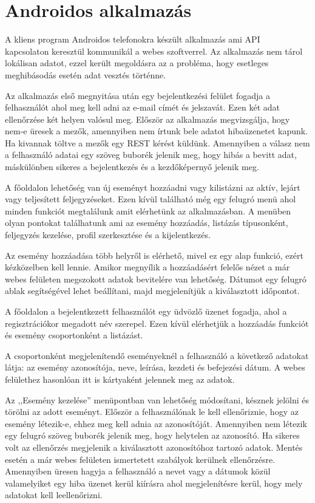 \documentclass[
]{thesis-ekf}
\theoremstyle{definition}
\theoremstyle{remark}
\begin{document}
\section{Androidos alkalmazás}
A kliens program Androidos telefonokra készült alkalmazás ami API~\cite{api_basic} kapcsolaton keresztül kommunikál a webes szoftverrel. Az alkalmazás nem tárol lokálisan adatot, ezzel került megoldásra az a probléma, hogy esetleges meghibásodás esetén adat vesztés történne. 

Az alkalmazás első megnyitása után egy bejelentkezési felület fogadja a felhasználót ahol meg kell adni az e-mail címét és jelszavát. Ezen két adat ellenőrzése két helyen valósul meg. Először az alkalmazás megvizsgálja, hogy nem-e üresek a mezők, amennyiben nem írtunk bele adatot hibaüzenetet kapunk. Ha kivannak töltve a mezők egy REST kérést küldünk. Amennyiben a válasz nem a felhasználó adatai egy szöveg buborék jelenik meg, hogy hibás a bevitt adat, máskülönben sikeres a bejelentkezés és a kezdőképernyő jelenik meg.

A főoldalon lehetőség van új eseményt hozzáadni vagy kilistázni az aktív, lejárt vagy teljesített feljegyzéseket. Ezen kívül található még egy felugró menü ahol minden funkciót megtalálunk amit elérhetünk az alkalmazásban. A menüben olyan pontokat találhatunk ami az esemény hozzáadás, listázás típusonként, feljegyzés kezelése, profil szerkesztése és a kijelentkezés. 

Az esemény hozzáadása több helyről is elérhető, mivel ez egy alap funkció, ezért kézközelben kell lennie. Amikor megnyílik a hozzáadásért felelős nézet a már webes felületen megszokott adatok bevitelére van lehetőség. Dátumot egy felugró ablak segítségével lehet beállítani, majd megjelenítjük a kiválasztott időpontot. 

A főoldalon a bejelentkezett felhasználót egy üdvözlő üzenet fogadja, ahol a regisztrációkor megadott név szerepel. Ezen kívül elérhetjük a hozzáadás funkciót és esemény csoportonként a listázást. 

A csoportonként megjelenítendő eseményeknél a felhasználó a következő adatokat látja: az esemény azonosítója, neve, leírása, kezdeti és befejezési dátum. A webes felülethez hasonlóan itt is kártyaként jelennek meg az adatok. 

Az ,,Esemény kezelése'' menüpontban van lehetőség módosítani, késznek jelölni és törölni az adott eseményt. Először a felhasználónak le kell ellenőriznie, hogy az esemény létezik-e, ehhez meg kell adnia az azonosítóját. Amennyiben nem létezik egy felugró szöveg buborék jelenik meg, hogy helytelen az azonosító. Ha sikeres volt az ellenőrzés megjelenik a kiválasztott azonosítóhoz tartozó adatok. Mentés esetén a már webes felületen ismertetett szabályok kerülnek ellenőrzésre. Amennyiben üresen hagyja a felhasználó a nevet vagy a dátumok közül valamelyiket egy hiba üzenet kerül kiírásra ahol megjelenítésre kerül, hogy mely adatokat kell leellenőrizni. 
\end{document}
